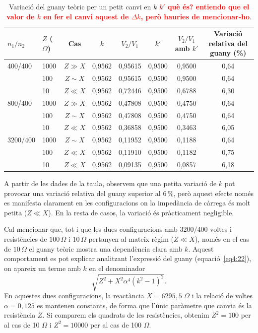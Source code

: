 \documentclass[a4paper,10.5pt]{report}
\begin{document}
\begin{table}[H]
	\centering
	\renewcommand{\arraystretch}{1.2}
	\caption{Variació del guany teòric per un petit canvi en $k$ \textbf{\textcolor{red}{$k'$ què és? entiendo que el valor de $k$ en fer el canvi aquest de $\Delta k$, però hauries de mencionar-ho}}.}
	\begin{tabular}{llcccccc}
		\toprule
		$n_1/n_2$ & $Z$ ($\Omega$) & Cas & $k$ & $V_2/V_1$ & $k'$ & $V_2/V_1$ amb $k'$ & Variació relativa del guany (\%) \\
		\midrule
		400/400 & 1000 & $Z \gg X$ & 0,9562 & 0,95615 & 0,9500 & 0,9500 & 0,64 \\
		& 100  & $Z \sim X$ & 0,9562 & 0,95615 & 0,9500 & 0,9500 & 0,64 \\
		& 10   & $Z \ll X$ & 0,9562 & 0,72446 & 0,9500 & 0,6788 & 6,30 \\
		\midrule
		800/400 & 1000 & $Z \gg X$ & 0,9562 & 0,47808 & 0,9500 & 0,4750 & 0,64 \\
		& 100  & $Z \sim X$ & 0,9562 & 0,47808 & 0,9500 & 0,4750 & 0,64 \\
		& 10   & $Z \ll X$ & 0,9562 & 0,36858 & 0,9500 & 0,3463 & 6,05 \\
		\midrule
		3200/400 & 1000 & $Z \sim X$ & 0,9562 & 0,11952 & 0,9500 & 0,1188 & 0,64 \\
		& 100  & $Z \ll X$ & 0,9562 & 0,11910 & 0,9500 & 0,1182 & 0,75 \\
		& 10   & $Z \ll X$ & 0,9562 & 0,09135 & 0,9500 & 0,0857 & 6,18 \\
		\bottomrule
	\end{tabular}
	\label{tab:4.6}
\end{table}

A partir de les dades de la taula, observem que una petita variació de $k$  pot provocar una variació relativa del guany superior al $6\,\%$, però aquest efecte només es manifesta clarament en les configuracions on la impedància de càrrega és molt petita ($Z \ll X$). En la resta de casos, la variació és pràcticament negligible.

Cal mencionar que, tot i que les dues configuracions amb $3200/400$ voltes i resistències de $100\,\Omega$ i $10\,\Omega$ pertanyen al mateix règim ($Z \ll X$), només en el cas de $10\,\Omega$ el guany teòric mostra una dependència clara amb $k$. Aquest comportament es pot explicar analitzant l’expressió del guany (equació~\ref{eq4:22}), on apareix un terme amb $k$ en el denominador
\begin{equation*}
	\sqrt{Z^2 + X^2 \alpha^4 (k^2 - 1)^2}.
\end{equation*}
En aquestes dues configuracions, la reactància $X = 6295,5$ $\Omega$ i la relació de voltes $\alpha = 0{,}125$ es mantenen constants, de forma que l’únic paràmetre que canvia és la resistència $Z$. Si comparem els quadrats de les resistències, obtenim $Z^2 = 100$ per al cas de 10 $\Omega$ i $Z^2 = 10000$ per al cas de 100 $\Omega$.
\end{document}
